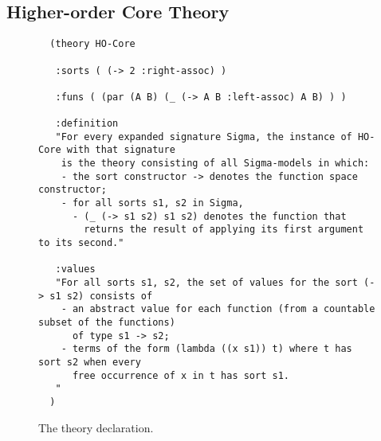 \begin{newver} 

\section{Higher-order Core Theory}
\label{sec:ho-core}

\begin{figure}[t]
  \small
  {\color{NavyBlue}
  \begin{verbatim}
  (theory HO-Core
  
   :sorts ( (-> 2 :right-assoc) )
  
   :funs ( (par (A B) (_ (-> A B :left-assoc) A B) ) )
  
   :definition
   "For every expanded signature Sigma, the instance of HO-Core with that signature
    is the theory consisting of all Sigma-models in which: 
    - the sort constructor -> denotes the function space constructor;
    - for all sorts s1, s2 in Sigma, 
      - (_ (-> s1 s2) s1 s2) denotes the function that
        returns the result of applying its first argument to its second."
    
   :values 
   "For all sorts s1, s2, the set of values for the sort (-> s1 s2) consists of
    - an abstract value for each function (from a countable subset of the functions)
      of type s1 -> s2;
    - terms of the form (lambda ((x s1)) t) where t has sort s2 when every
      free occurrence of x in t has sort s1.
   " 
  )
  \end{verbatim}
  }%
  \caption{The  theory declaration.}
  \label{fig:HO-Core}
  \end{figure}
  

%


\end{newver}
